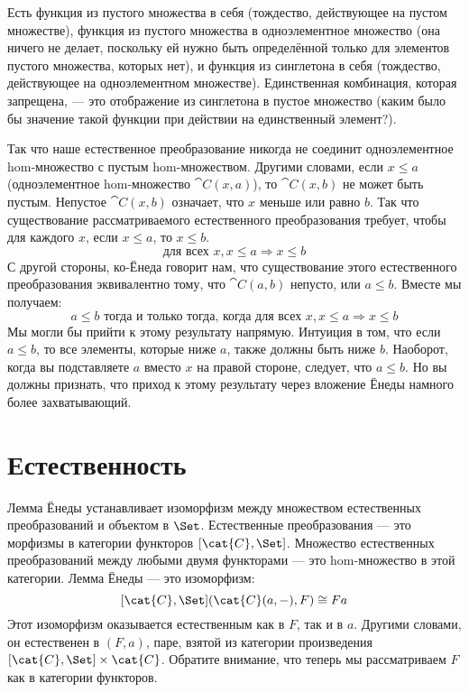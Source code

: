 Есть функция из пустого множества в себя (тождество, действующее на
пустом множестве), функция  из пустого множества в
одноэлементное множество (она ничего не делает, поскольку ей нужно быть определённой только для
элементов пустого множества, которых нет), и функция из
синглетона в себя (тождество, действующее на одноэлементном множестве).
Единственная комбинация, которая запрещена, --- это отображение из синглетона в
пустое множество (каким было бы значение такой функции при действии на
единственный элемент?).

Так что наше естественное преобразование никогда не соединит одноэлементное hom-множество с
пустым hom-множеством. Другими словами, если $x \leqslant a$
(одноэлементное hom-множество $\cat{C}(x, a)$), то $\cat{C}(x, b)$ не может быть
пустым. Непустое $\cat{C}(x, b)$ означает, что $x$ меньше или
равно $b$. Так что существование рассматриваемого естественного преобразования
требует, чтобы для каждого $x$, если
$x \leqslant a$, то $x \leqslant b$.
\[\text{для всех } x, x \leqslant a \Rightarrow x \leqslant b\]
С другой стороны, ко-Ёнеда говорит нам, что существование этого естественного
преобразования эквивалентно тому, что $\cat{C}(a, b)$ непусто, или
$a \leqslant b$. Вместе мы получаем:
\[a \leqslant b \text{ тогда и только тогда, когда для всех } x, x \leqslant a \Rightarrow x \leqslant b\]
Мы могли бы прийти к этому результату напрямую. Интуиция в том, что если
$a \leqslant b$, то все элементы, которые ниже $a$,
также должны быть ниже $b$. Наоборот, когда вы подставляете
$a$ вместо $x$ на правой стороне, следует, что
$a \leqslant b$. Но вы должны признать, что приход к этому
результату через вложение Ёнеды намного более захватывающий.

\section{Естественность}

Лемма Ёнеды устанавливает изоморфизм между множеством естественных
преобразований и объектом в $\Set$. Естественные преобразования ---
это морфизмы в категории функторов $[\cat{C}, \Set]$. Множество
естественных преобразований между любыми двумя функторами --- это hom-множество в этой
категории. Лемма Ёнеды --- это изоморфизм:
\[[\cat{C}, \Set](\cat{C}(a, -), F) \cong F a\]
Этот изоморфизм оказывается естественным как в $F$, так и в
$a$. Другими словами, он естественен в $(F, a)$, паре,
взятой из категории произведения  $[\cat{C}, \Set] \times \cat{C}$. Обратите внимание,
что теперь мы рассматриваем $F$ как  в категории
функторов.


